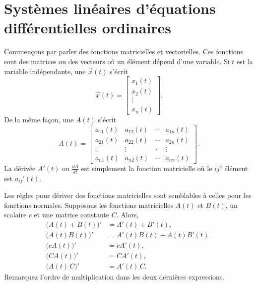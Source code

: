 
\sectionnewpage
\section{Systèmes linéaires d'équations différentielles ordinaires}
\label{linsystems:section}


Commençons par parler des fonctions matricielles et vectorielles. Ces fonctions sont des matrices ou des vecteurs où un élément dépend d'une variable. Si $t$ est la variable indépendante, une
\emph{}
$\vec{x}(t)$ s'écrit
\begin{equation*}
\vec{x}(t) = \begin{bmatrix}
x_1(t) \\
x_2(t) \\
\vdots \\
x_n(t)
\end{bmatrix} .
\end{equation*}
De la même façon, une \emph{} $A(t)$ s'écrit
\begin{equation*}
A(t) =
\begin{bmatrix}
a_{11}(t) & a_{12}(t) & \cdots & a_{1n}(t) \\
a_{21}(t) & a_{22}(t) & \cdots & a_{2n}(t) \\
\vdots & \vdots & \ddots & \vdots \\
a_{n1}(t) & a_{n2}(t) & \cdots & a_{nn}(t)
\end{bmatrix} .
\end{equation*}
La dérivée $A'(t)$ ou $\frac{dA}{dt}$ est simplement la fonction matricielle où le $ij^{\text{e}}$ élément est $a_{ij}'(t)$.

Les règles pour dériver des fonctions matricielles sont semblables à celles pour les fonctions normales. Supposons les fonctions matricielles $A(t)$ et $B(t)$, un scalaire $c$ et une matrice constante $C$. Alors,
\begin{align*}
\bigl(A(t)+B(t)\bigr)' & = A'(t) + B'(t), \\
\bigl(A(t)B(t)\bigr)' & = A'(t)B(t) + A(t)B'(t), \\
\bigl(cA(t)\bigr)' & = cA'(t), \\
\bigl(CA(t)\bigr)' & = CA'(t), \\
\bigl(A(t)\,C\bigr)' & = A'(t)\,C .
\end{align*}
Remarquez l'ordre de multiplication dans les deux dernières expressions.

